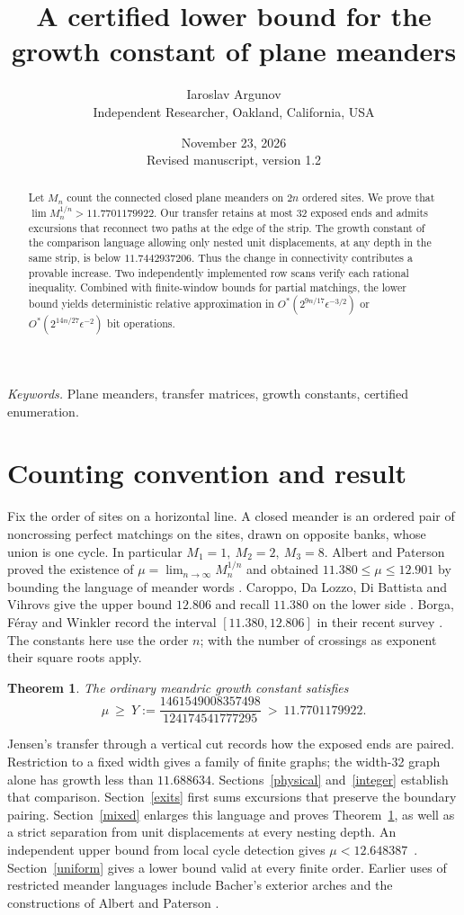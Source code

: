 \documentclass[11pt]{article}
\title{\bfseries A certified lower bound for the growth constant of plane meanders}
\author{Iaroslav Argunov\\{\small Independent Researcher, Oakland, California, USA}}
\date{November 23, 2026\\{\small Revised manuscript, version 1.2}}
\newtheorem{theorem}{Theorem}
\begin{document}
\maketitle
\begin{abstract}
Let \(M_n\) count the connected closed plane meanders on \(2n\) ordered sites. We prove that \(\lim M_n^{1/n}>11.7701179922\). Our transfer retains at most 32 exposed ends and admits excursions that reconnect two paths at the edge of the strip. The growth constant of the comparison language allowing only nested unit displacements, at any depth in the same strip, is below \(11.7442937206\). Thus the change in connectivity contributes a provable increase. Two independently implemented row scans verify each rational inequality. Combined with finite-window bounds for partial matchings, the lower bound yields deterministic relative approximation in \(O^*(2^{9n/17}\epsilon^{-3/2})\) or \(O^*(2^{14n/27}\epsilon^{-2})\) bit operations.
\end{abstract}

\noindent\textit{Keywords.} Plane meanders, transfer matrices, growth constants, certified enumeration.

\section{Counting convention and result}
Fix the order of sites on a horizontal line. A closed meander is an ordered pair of noncrossing perfect matchings on the sites, drawn on opposite banks, whose union is one cycle. In particular \(M_1=1,\ M_2=2,\ M_3=8\). Albert and Paterson proved the existence of
\(\mu=\lim_{n\to\infty}M_n^{1/n}\) and obtained \(11.380\le\mu\le12.901\) by bounding the language of meander words \cite{ap}. Caroppo, Da Lozzo, Di Battista and Vihrovs give the upper bound \(12.806\) and recall \(11.380\) on the lower side \cite{caroppo}. Borga, F\'eray and Winkler record the interval \([11.380,12.806]\) in their recent survey \cite[p.~41]{bfw}. The constants here use the order \(n\); with the number of crossings as exponent their square roots apply.

\begin{theorem}\label{mixedclaim}
The ordinary meandric growth constant satisfies
\[
             \mu\ \ge\ Y:=\frac{1461549008357498}{124174541777295}\ >\ 11.7701179922 .
\]
\end{theorem}

Jensen's transfer through a vertical cut \cite{jensen} records how the exposed ends are paired. Restriction to a fixed width gives a family of finite graphs; the width-32 graph alone has growth less than \(11.688634\). Sections~\ref{physical} and~\ref{integer} establish that comparison. Section~\ref{exits} first sums excursions that preserve the boundary pairing. Section~\ref{mixed} enlarges this language and proves Theorem~\ref{mixedclaim}, as well as a strict separation from unit displacements at every nesting depth. An independent upper bound from local cycle detection gives \(\mu<12.648387\)~\cite{windows}. Section~\ref{uniform} gives a lower bound valid at every finite order. Earlier uses of restricted meander languages include Bacher's exterior arches \cite{bacher} and the constructions of Albert and Paterson \cite{ap}.
\end{document}
